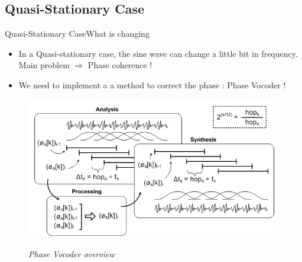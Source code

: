 \documentclass{bredelebeamer}
\begin{document}
\subsection{Quasi-Stationary Case}
\begin{frame}{Quasi-Stationary Case}{What is changing}
\begin{itemize}
\item In a Quasi-stationary case, the sine wave can change a little bit in frequency. \\
 Main problem $\Rightarrow$ Phase coherence !
\item We need to implement a a method to correct the phase : Phase Vocoder !
\end{itemize}

\begin{figure}
{\includegraphics[scale=0.45]{pvoverview.png}}
	\caption{\it Phase Vocoder overview}
\end{figure}


\end{frame}
\end{document}
